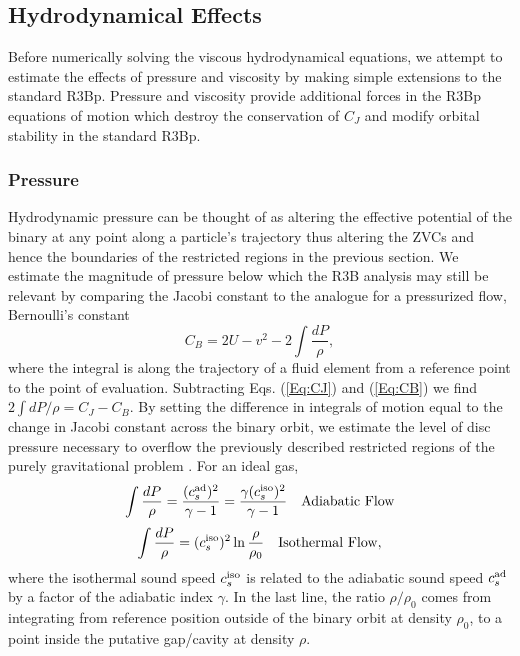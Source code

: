 \subsection{Hydrodynamical Effects}
\label{Viscous and Pressure Effects}
Before numerically solving the viscous hydrodynamical equations, we attempt to estimate the effects of pressure and viscosity by making simple extensions to the standard R3Bp. Pressure and viscosity provide additional forces in the
R3Bp equations of motion which destroy the conservation of $C_J$ and 
modify orbital stability in the standard R3Bp.

\subsubsection{Pressure}
\label{Pressure}
Hydrodynamic pressure can be thought of
as altering the effective potential of the binary at any point along
a particle's trajectory thus altering the ZVCs and hence the
boundaries of the restricted regions in the previous section. 
We estimate the magnitude of pressure below which the R3B analysis may still be relevant by comparing 
the Jacobi constant to the analogue for a pressurized flow, Bernoulli's constant
\begin{equation}
C_B =  2U - v^2 - 2\int{\frac{dP}{\rho}},
\label{Eq:CB}
\end{equation}
where the integral is along the trajectory of a fluid element from a
reference point to the point of evaluation.  Subtracting Eqs.
(\ref{Eq:CJ}) and (\ref{Eq:CB}) we find $2\int{dP/\rho}= C_J - C_B$. 
By setting the difference in integrals of motion equal to the change in 
Jacobi constant across the binary orbit, we estimate the level of disc pressure 
necessary to overflow the previously described restricted regions of the purely gravitational problem \citep[see][who perform a similar calculation]{PR:InnerDsks:1981, RP:Excretion:1981}. For an ideal gas,
\[
\nonumber 
\int{\frac{dP}{\rho}} = \frac{(c^{\rm{ad}}_{s})^2 }{\gamma -1}  = \frac{\gamma (c^{\rm{iso}}_{s})^2 }{\gamma -1} \quad \rm{Adiabatic} \ \rm{Flow} \nonumber
\]
\begin{equation}
\label{dP_iso}
\int{\frac{dP}{\rho}} = (c^{\rm{iso}}_{s})^2 \ln{\frac{\rho}{\rho_0}} \quad \rm{Isothermal} \ \rm{Flow},
\end{equation}
where the isothermal sound speed $c^{\rm{iso}}_{s}$ is related to the
adiabatic sound speed $c^{\rm{ad}}_{s}$ by a factor of the adiabatic
index $\gamma$. In the last line, the ratio $\rho/\rho_0$ comes from
integrating from reference position outside of the binary orbit at
density $\rho_0$, to a point inside the putative gap/cavity at density $\rho$.


